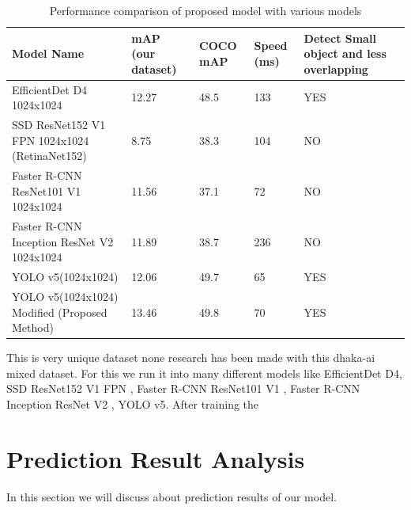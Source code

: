 \begin{table}[!h]
  \centering
  \caption[Performance Comparison of Proposed Model with Various Models]{Performance comparison of proposed model with various models}
  \label{tab:model_comp}
  {\renewcommand{\arraystretch}{1.7}
      \begin{tabular}{p{4cm} p{1cm} p{0.8cm} p{1cm} p{2.6cm}}
          \toprule
          Model Name                                    & mAP (our dataset) & COCO mAP & Speed (ms) & Detect Small object and less overlapping \\
          \hline
          EfficientDet D4 1024x1024                     & 12.27             & 48.5     & 133        & YES                                      \\
          SSD ResNet152 V1 FPN 1024x1024 (RetinaNet152) & 8.75              & 38.3     & 104        & NO                                       \\
          Faster R-CNN ResNet101 V1 1024x1024           & 11.56             & 37.1     & 72         & NO                                       \\
          Faster R-CNN Inception ResNet V2 1024x1024    & 11.89             & 38.7     & 236        & NO                                       \\
          YOLO v5(1024x1024)                            & 12.06             & 49.7     & 65         & YES                                      \\
          YOLO v5(1024x1024) Modified (Proposed Method) & 13.46             & 49.8     & 70         & YES                                      \\
          \bottomrule
    \end{tabular}
  }
\end{table}

This is very unique dataset none research has been made with this dhaka-ai mixed dataset. For this we run it into many different models like EfficientDet D4, SSD ResNet152 V1 FPN , Faster R-CNN ResNet101 V1 , Faster R-CNN Inception ResNet V2 , YOLO v5. After training the 


\newpage
\section{Prediction Result Analysis}
In this section we will discuss about prediction results of our model.

